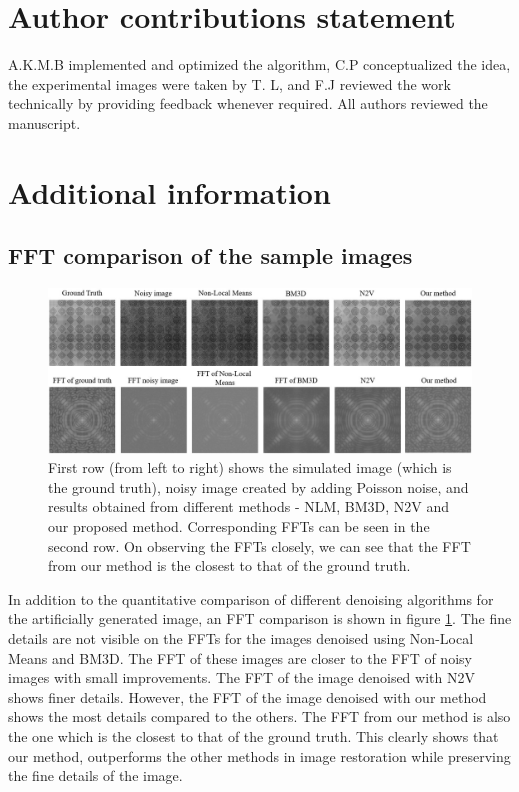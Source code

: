 \documentclass[fleqn,10pt]{wlscirep}
\begin{document}
	
	\section*{Author contributions statement}
	
	A.K.M.B implemented and optimized the algorithm, C.P conceptualized the idea, the experimental images were taken by T. L, and F.J reviewed the work technically by providing feedback whenever required.  All authors reviewed the manuscript. 
	
	\section*{Additional information}
	
	\subsection*{FFT comparison of the sample images}
	\label{fft_comparison}
	
	\begin{figure}[H]
		\centering
		\includegraphics[scale=0.6]{./imgs/comparison-sample_fft.jpg}
		\caption{First row (from left to right) shows the simulated image (which is the ground truth), noisy image created by adding Poisson noise, and  results obtained from different methods - NLM, BM3D, N2V and our proposed method. Corresponding FFTs can be seen in the second row. On observing the FFTs closely, we can see that the FFT from our method is the closest to that of the ground truth.}
		\label{fig:comparison_sample_fft}
	\end{figure}

	In addition to the quantitative comparison of different denoising algorithms for the artificially generated image, an FFT comparison is shown in figure \ref{fig:comparison_sample_fft}. The fine details are not visible on the FFTs for the images denoised using Non-Local Means and BM3D. The FFT of these images are closer to the FFT of noisy images with small improvements. The FFT of the image denoised with N2V shows finer details. However, the FFT of the image denoised with our method shows the most details compared to the others. The FFT from our method is also the one which is the closest to that of the ground truth. This clearly shows that our method, outperforms the other methods in image restoration while preserving the fine details of the image. 
	
\end{document}
